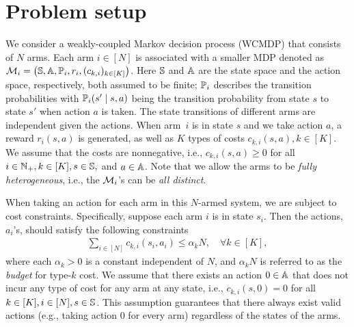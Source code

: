 \documentclass[11pt,letterpaper]{article}
\begin{document}
\section{Problem setup}\label{sec:background}
We consider a weakly-coupled Markov decision process (WCMDP) that consists of $N$ arms.
Each arm $i\in[N]$ is associated with a smaller MDP denoted as $\mathcal{M}_i=\left(\mathbb{S}, \mathbb{A},\mathbb{P}_i, r_i, (c_{k,i})_{k\in[K]}\right)$.
Here $\mathbb{S}$ and $\mathbb{A}$ are the state space and the action space, respectively, both assumed to be finite; $\mathbb{P}_i$ describes the transition probabilities with $\mathbb{P}_i(s'\mid s,a)$ being the transition probability from state $s$ to state $s'$ when action $a$ is taken.
The state transitions of different arms are independent given the actions.
When arm~$i$ is in state $s$ and we take action $a$, a reward $r_i(s,a)$ is generated, as well as $K$ types of costs $c_{k,i}(s,a), k\in[K]$. 
We assume that the costs are nonnegative, i.e., $c_{k,i}(s,a)\ge 0$ for all $i\in\mathbb{N}_+,k\in[K],s\in\mathbb{S},$ and $a\in\mathbb{A}$.
Note that we allow the arms to be \emph{fully heterogeneous}, i.e., the $\mathcal{M}_i$'s can be \emph{all distinct}.


When taking an action for each arm in this $N$-armed system, we are subject to cost constraints.
Specifically, suppose each arm $i$ is in state $s_i$.
Then the actions, $a_i$'s, should satisfy the following constraints
\begin{align}\label{eq:cost}
    \sum_{i\in[N]} c_{k,i}(s_i, a_i)\le \alpha_k N,\quad \forall k\in[K],
\end{align}
where each $\alpha_k>0$ is a constant independent of $N$, and $\alpha_k N$ is referred to as the \emph{budget} for type-$k$ cost.
We assume that there exists an action $0\in\mathbb{A}$ that does not incur any type of cost for any arm at any state, i.e., $c_{k,i}(s,0)=0$ for all $k\in[K],i\in[N],s\in\mathbb{S}$.
This assumption guarantees that there always exist valid actions (e.g., taking action $0$ for every arm) regardless of the states of the arms.
\end{document}
